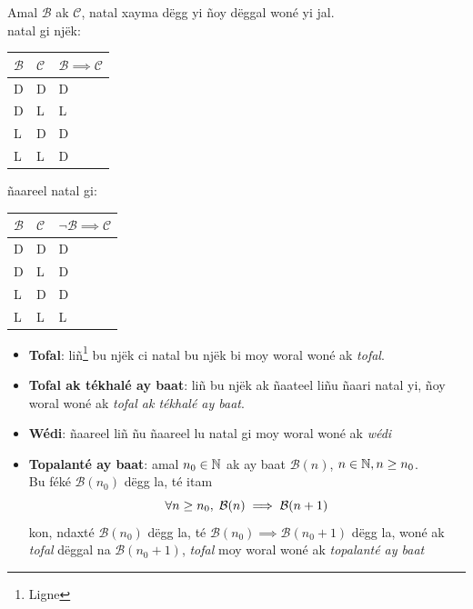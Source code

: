\documentclass[twoside, a4paper]{article}
\begin{document}
\begin{tcolorbox}[enhanced jigsaw,breakable,pad at break*=1mm, colback=orange!5!white,colframe=white!75!black,title= Seetlu,
  watermark color=white]
Amal $\mathcal{B}$ ak $\mathcal{C}$, natal xayma dëgg yi ñoy dëggal woné yi jal.\\

natal gi njëk:\\

\begin{tabularx}{0.8\textwidth} { 
  | >{\centering\arraybackslash}X 
  | >{\centering\arraybackslash}X 
  | >{\centering\arraybackslash}X |}
 \hline
$\mathcal{B}$& $\mathcal{C}$ & $\mathcal{B}\implies\mathcal{C}$\\
 \hline
 D  & D & D \\
 D  & L & L \\
 L  & D & D \\
 L  & L & D \\
\hline
\end{tabularx}
\vspace{0.3cm}
ñaareel natal gi:
\vspace{0.3cm}
\begin{tabularx}{0.8\textwidth} { 
  | >{\centering\arraybackslash}X 
  | >{\centering\arraybackslash}X 
  | >{\centering\arraybackslash}X |}
 \hline
$\mathcal{B}$& $\mathcal{C}$ & $\neg\mathcal{B}\implies\mathcal{C}$\\
 \hline
 D  & D & D \\
 D  & L & D \\
 L  & D & D \\
 L  & L & L \\
\hline
\end{tabularx}

\begin{itemize}
    \item \textbf{Tofal}: liñ\footnote{Ligne} bu njëk ci natal bu njëk bi moy woral woné ak \textit{tofal}.
    \item \textbf{Tofal ak tékhalé ay baat}: liñ bu njëk ak ñaateel liñu ñaari natal yi, ñoy woral woné ak \textit{tofal ak tékhalé ay baat}.
    \item \textbf{Wédi}: ñaareel liñ ñu ñaareel lu natal gi moy woral woné ak \textit{wédi}
    \item \textbf{Topalanté ay baat}: amal $n_0 \in \mathbb{N}$ ak ay baat $\mathcal{B}(n)$, $n \in \mathbb{N}, n \geq n_0$.\\
Bu féké $\mathcal{B}(n_0)$ dëgg la, té itam 
$$\forall n\geq n_0, \hspace{0.1cm}\mathcal{B}(n) \implies \mathcal{B}(n+1)$$ 
kon, ndaxté $\mathcal{B}(n_0)$ dëgg la, té $\mathcal{B}(n_0) \implies \mathcal{B}(n_0+1)$ dëgg la, woné ak \textit{tofal} dëggal na $\mathcal{B}(n_0+1)$, \textit{tofal} moy woral woné ak \textit{topalanté ay baat}
\end{itemize}

\end{tcolorbox}
\end{document}
